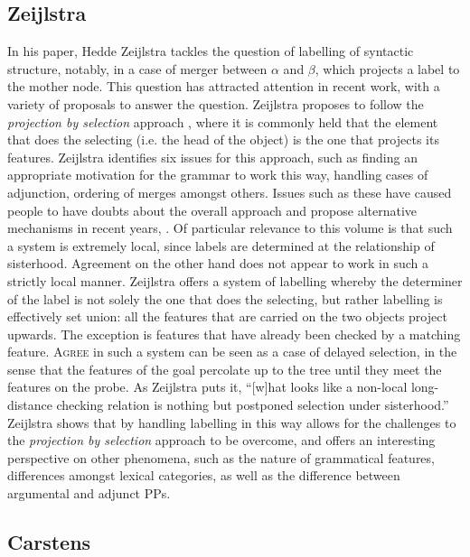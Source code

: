 \documentclass[output=paper
,modfonts
,nonflat]{langsci/langscibook}
\begin{document}
\subsection{Zeijlstra}
\label{sec:zeiljstra}

In his paper, Hedde Zeijlstra tackles the question of labelling of syntactic structure, notably, in a case of merger between $\alpha$ and $\beta$, which projects a label to the mother node.
This question has attracted attention in recent work, with a variety of proposals to answer the question.
Zeijlstra proposes to follow the \textit{projection by selection} approach \citep{Adger2003}, where it is commonly held that the element that does the selecting (i.e. the head of the object) is the one that projects its features.
Zeijlstra identifies six issues for this approach, such as finding an appropriate motivation for the grammar to work this way, handling cases of adjunction, ordering of merges amongst others.
Issues such as these have caused people to have doubts about the overall approach and propose alternative mechanisms in recent years, .
Of particular relevance to this volume is that such a system is extremely local, since labels are determined at the relationship of sisterhood.
Agreement on the other hand does not appear to work in such a strictly local manner.
Zeijlstra offers a system of labelling whereby the determiner of the label is not solely the one that does the selecting, but rather labelling is effectively set union: all the features that are carried on the two objects project upwards.
The exception is features that have already been checked by a matching feature.
\textsc{Agree} in such a system can be seen as a case of delayed selection, in the sense that the features of the goal percolate up to the tree until they meet the features on the probe.
As Zeijlstra puts it, ``[w]hat looks like a non-local long-distance checking relation is nothing but postponed selection under sisterhood.''
Zeijlstra shows that by handling labelling in this way allows for the challenges to the \textit{projection by selection} approach to be overcome, and offers an interesting perspective on other phenomena, such as the nature of grammatical features, differences amongst lexical categories, as well as the difference between argumental and adjunct PPs.

\subsection{Carstens}
\label{sec:carstens}
\end{document}
